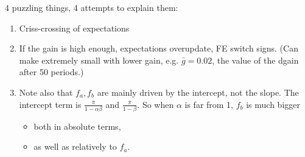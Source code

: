 \documentclass[11pt]{article}
\renewcommand{\[}{\begin{equation}}
\renewcommand{\]}{\end{equation}}
\begin{document}
4 puzzling things, 4 attempts to explain them:
\begin{enumerate}
\item Criss-crossing of expectations
\item [] If the gain is high enough, expectations overupdate, FE switch signs. (Can make extremely small with lower gain, e.g. $\bar{g} = 0.02$, the value of the dgain after 50 periods.)
\item[] Note also that $f_a, f_b$ are mainly driven by the intercept, not the slope. The intercept term is $\frac{\bar{\pi}}{1-\alpha\beta}$ and $\frac{\bar{\pi}}{1- \beta}$. So when $\alpha$ is far from 1, $f_b$ is much bigger
	\begin{itemize}
	\item both in absolute terms,
	\item as well as relatively to $f_a$.
	\end{itemize}


\end{enumerate}
\end{document}
